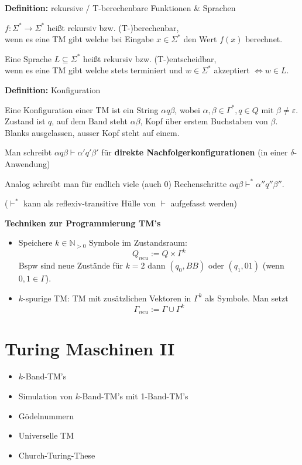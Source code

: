 \documentclass[a4paper,graphics,11pt]{article}
\newcommand{\eps}[0]{\varepsilon}
\begin{document}
\textbf{Definition:} rekursive / T-berechenbare Funktionen \& Sprachen

$f : \Sigma^* \to \Sigma^*$ heißt rekursiv bzw. (T-)berechenbar,\\
wenn es eine TM gibt welche bei Eingabe $x \in \Sigma^*$ den Wert $f(x)$ berechnet.

Eine Sprache $L \subseteq \Sigma^*$ heißt rekursiv bzw. (T-)entscheidbar,\\
wenn es eine TM gibt welche stets terminiert und $w \in \Sigma^*$ akzeptiert $\iff w \in L$.

\strut

\textbf{Definition:} Konfiguration

Eine Konfiguration einer TM ist ein String $\alpha q \beta$, wobei $\alpha,\beta \in \Gamma^*,q \in Q$
mit $\beta \neq \eps$.\\
Zustand ist $q$, auf dem Band steht $\alpha\beta$, Kopf über erstem Buchstaben von $\beta$.\\
Blanks ausgelassen, ausser Kopf steht auf einem.

Man schreibt $\alpha q\beta \vdash \alpha'q'\beta'$ für \textbf{direkte Nachfolgerkonfigurationen}
(in einer $\delta$-Anwendung)

Analog schreibt man für endlich viele (auch 0) Rechenschritte $\alpha q \beta \vdash^* \alpha''q''\beta''$.

($\vdash^*$ kann als reflexiv-transitive Hülle von $\vdash$ aufgefasst werden)

\strut

\textbf{Techniken zur Programmierung TM's}

\begin{itemize}
    \item  Speichere $k \in \mathbb{N}_{>0}$ Symbole im Zustandsraum:
        $$
            Q_{neu} := Q \times \Gamma^k
        $$
        Bspw sind neue Zustände für $k = 2$ dann $(q_0, BB)$ oder $(q_1, 01)$ (wenn $0,1 \in \Gamma$).\\

    \item $k$-spurige TM: TM mit zusätzlichen Vektoren in $\Gamma^k$ als Symbole. Man setzt
        $$
            \Gamma_{neu} := \Gamma \cup \Gamma^k
        $$
\end{itemize}



\newpage



\section{Turing Maschinen II}
\begin{itemize}
    \item $k$-Band-TM's
    \item Simulation von $k$-Band-TM's mit 1-Band-TM's
    \item Gödelnummern
    \item Universelle TM
    \item Church-Turing-These
\end{itemize}
\end{document}
